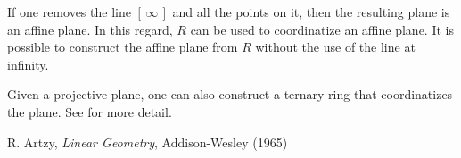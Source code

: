 \documentclass[12pt]{article}
\begin{document}
If one removes the line $[\,\infty\,]$ and all the points on it, then the resulting plane is an affine plane.  In this regard, $R$ can be used to coordinatize an affine plane.  It is possible to construct the affine plane from $R$ without the use of the line at infinity.

Given a projective plane, one can also construct a ternary ring that coordinatizes the plane.  See  for more detail.

\begin{thebibliography}{7}
 R. Artzy, {\it Linear Geometry}, Addison-Wesley (1965)
\end{thebibliography}
\end{document}
